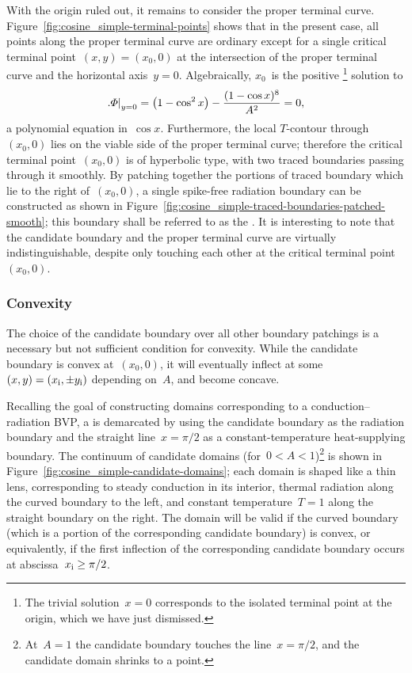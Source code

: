 With the origin ruled out,
it remains to consider the proper terminal curve.
Figure~\ref{fig:cosine_simple-terminal-points} shows that in the present case,
all points along the proper terminal curve are ordinary
except for a single critical terminal point~$(x, y) = (x_0, 0)$
at the intersection of the proper terminal curve
and the horizontal axis~$y = 0$.
Algebraically, $x_0$~is the positive%
\footnote{
  The trivial solution~$x = 0$
  corresponds to the isolated terminal point at the origin,
  which we have just dismissed.
}
solution to
\begin{equation}
  \eval[\textsize]{\Phi}_{y=0}
  = \roundbr*{1 - \cos^2 x} - \frac{(1 - \cos x)^8}{A^2}
  = 0,
  \label{eq:cosine-simple-critical-terminal-point-x}
\end{equation}
a polynomial equation in~$\cos x$.
Furthermore, the local $T$-contour through~$(x_0, 0)$
lies on the viable side of the proper terminal curve;
therefore the critical terminal point~$(x_0, 0)$ is of hyperbolic type,
with two traced boundaries passing through it smoothly.
By patching together the portions of traced boundary
which lie to the right of~$(x_0, 0)$,
a single spike-free radiation boundary can be constructed
as shown in Figure~\ref{fig:cosine_simple-traced-boundaries-patched-smooth};
this boundary shall be referred to as the .
It is interesting to note that
the candidate boundary and the proper terminal curve
are virtually indistinguishable,
despite only touching each other at the critical terminal point~$(x_0, 0)$.

\subsubsection{Convexity}
\label{sec:cartesian.cosine.simple.convexity}

The choice of the candidate boundary over all other boundary patchings
is a necessary but not sufficient condition for convexity.
While the candidate boundary is convex at~$(x_0, 0)$,
it will eventually inflect
at some~$(x, y) = (x_{\mathrm{i}}, \pm y_{\mathrm{i}})$ depending on~$A$,
and become concave.

Recalling the goal of constructing domains
corresponding to a conduction--radiation BVP\@,
a  is demarcated by using
the candidate boundary as the radiation boundary
and the straight line~$x = \pi/2$
as a constant-temperature heat-supplying boundary.
The continuum of candidate domains (for~$0 < A < 1$)\footnote{
  At~$A = 1$ the candidate boundary touches the line~$x = \pi/2$,
  and the candidate domain shrinks to a point.
}
is shown in Figure~\ref{fig:cosine_simple-candidate-domains};
each domain is shaped like a thin lens,
corresponding to steady conduction in its interior,
thermal radiation along the curved boundary to the left,
and constant temperature~$T = 1$ along the straight boundary on the right.
The domain will be valid if the curved boundary
(which is a portion of the corresponding candidate boundary)
is convex, or equivalently,
if the first inflection of the corresponding candidate boundary
occurs at abscissa~$x_{\mathrm{i}} \ge \pi/2$.

